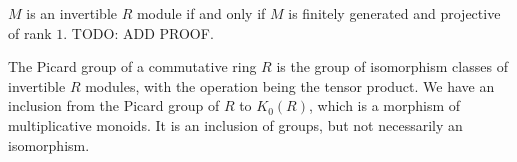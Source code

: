 $M$ is an invertible $R$ module if and only if $M$ is finitely generated and projective of rank $1$. TODO: ADD PROOF.

The Picard group of a commutative ring $R$ is the group of isomorphism classes of invertible $R$ modules, with the operation being the tensor product. We have an inclusion from the Picard group of $R$ to $K_0(R)$, which is a morphism of multiplicative monoids. It is an inclusion of groups, but not necessarily an isomorphism.

